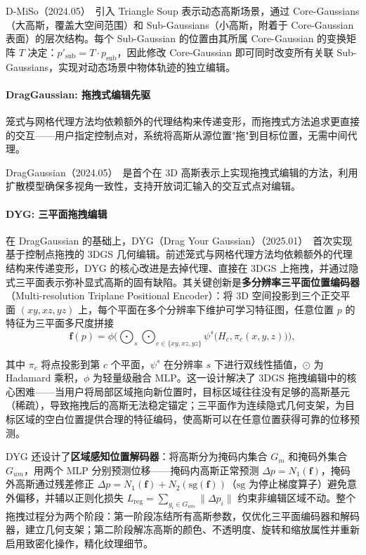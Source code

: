 D-MiSo（2024.05）~\cite{2405_14276}引入 Triangle Soup 表示动态高斯场景，通过 Core-Gaussians（大高斯，覆盖大空间范围）和 Sub-Gaussians（小高斯，附着于 Core-Gaussian 表面）的层次结构。每个 Sub-Gaussian 的位置由其所属 Core-Gaussian 的变换矩阵 $T$ 决定：$p'_{\text{sub}} = T \cdot p_{\text{sub}}$，因此修改 Core-Gaussian 即可同时改变所有关联 Sub-Gaussians，实现对动态场景中物体轨迹的独立编辑。

\paragraph{DragGaussian: 拖拽式编辑先驱}

笼式与网格代理方法均依赖额外的代理结构来传递变形，而拖拽式方法追求更直接的交互——用户指定控制点对，系统将高斯从源位置"拖"到目标位置，无需中间代理。

DragGaussian（2024.05）~\cite{2405_05800}是首个在 3D 高斯表示上实现拖拽式编辑的方法，利用扩散模型确保多视角一致性，支持开放词汇输入的交互式点对编辑。

\paragraph{DYG: 三平面拖拽编辑}

在 DragGaussian 的基础上，DYG（Drag Your Gaussian）（2025.01）~\cite{2501_18672}首次实现基于控制点拖拽的 3DGS 几何编辑。前述笼式与网格代理方法均依赖额外的代理结构来传递变形，DYG 的核心改进是去掉代理、直接在 3DGS 上拖拽，并通过隐式三平面表示弥补显式高斯的固有缺陷。其关键创新是\textbf{多分辨率三平面位置编码器}（Multi-resolution Triplane Positional Encoder）：将 3D 空间投影到三个正交平面 $(xy, xz, yz)$ 上，每个平面在多个分辨率下维护可学习特征图，任意位置 $p$ 的特征为三平面多尺度拼接
\begin{equation}
\mathbf{f}(p) = \phi\!\Big(\bigodot_{s} \bigodot_{c \in \{xy, xz, yz\}} \psi^s\!\big(H_c, \pi_c(x,y,z)\big)\Big),
\end{equation}

其中 $\pi_c$ 将点投影到第 $c$ 个平面，$\psi^s$ 在分辨率 $s$ 下进行双线性插值，$\odot$ 为 Hadamard 乘积，$\phi$ 为轻量级融合 MLP。这一设计解决了 3DGS 拖拽编辑中的核心困难——当用户将局部区域拖向新位置时，目标区域往往没有足够的高斯基元（稀疏），导致拖拽后的高斯无法稳定锚定；三平面作为连续隐式几何支架，为目标区域的空白位置提供合理的特征编码，使高斯可以在任意位置获得可靠的位移预测。

DYG 还设计了\textbf{区域感知位置解码器}：将高斯分为掩码内集合 $G_m$ 和掩码外集合 $G_{um}$，用两个 MLP 分别预测位移——掩码内高斯正常预测 $\Delta p = N_1(\mathbf{f})$，掩码外高斯通过残差修正 $\Delta p = N_1(\mathbf{f}) + N_2(\mathrm{sg}(\mathbf{f}))$（$\mathrm{sg}$ 为停止梯度算子）避免意外偏移，并辅以正则化损失 $L_\text{reg} = \sum_{g_i \in G_{um}} \|\Delta p_i\|$ 约束非编辑区域不动。整个拖拽过程分为两个阶段：第一阶段冻结所有高斯参数，仅优化三平面编码器和解码器，建立几何支架；第二阶段解冻高斯的颜色、不透明度、旋转和缩放属性并重新启用致密化操作，精化纹理细节。

